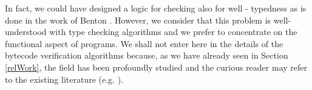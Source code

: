 \begin{description}
	In fact, we could have  designed a logic for checking also for well - typedness as 
	is done in the work of Benton \cite{B04tlsj}. However, we consider that this problem is well-understood
	with type checking algorithms and we prefer to concentrate on the functional aspect of programs. 
	We shall not enter  here in the details of the bytecode verification algorithms
	because, as we have already seen in Section \ref{relWork}, the field has been profoundly studied
	and the curious reader may refer to the existing literature (e.g. \cite{Ljbc}). 
\end{description}







